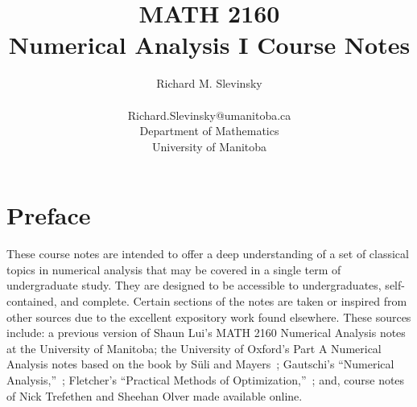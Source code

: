 \documentclass[12pt,letterpaper]{report}
\begin{document}
\title{MATH 2160\\
Numerical Analysis I Course Notes}
\author{Richard M. Slevinsky\\~\\
Richard.Slevinsky@umanitoba.ca\\
Department of Mathematics\\
University of Manitoba}
\date{}
\maketitle
\tableofcontents

\chapter*{Preface}

These course notes are intended to offer a deep understanding of a set of classical topics in numerical analysis that may be covered in a single term of undergraduate study. They are designed to be accessible to undergraduates, self-contained, and complete. Certain sections of the notes are taken or inspired from other sources due to the excellent expository work found elsewhere. These sources include: a previous version of Shaun Lui's MATH 2160 Numerical Analysis notes at the University of Manitoba; the University of Oxford's Part A Numerical Analysis notes based on the book by S\"uli and Mayers~\cite{Suli-Mayers-03}; Gautschi's ``Numerical Analysis,''~\cite{Gautschi-12}; Fletcher's ``Practical Methods of Optimization,''~\cite{Fletcher-80-1,Fletcher-80-2}; and, course notes of Nick Trefethen and Sheehan Olver made available online.










\end{document}
